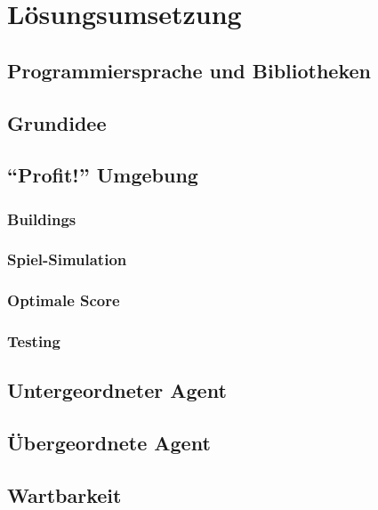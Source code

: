 \section{Lösungsumsetzung}\label{cap:umsetzung}

\subsection{Programmiersprache und Bibliotheken}
\subsection{Grundidee}
\subsection{“Profit!” Umgebung}
\subsubsection{Buildings}
\subsubsection{Spiel-Simulation}
\subsubsection{Optimale Score}
\subsubsection{Testing}

\subsection{Untergeordneter Agent}
\subsection{Übergeordnete Agent}
\subsection{Wartbarkeit}
